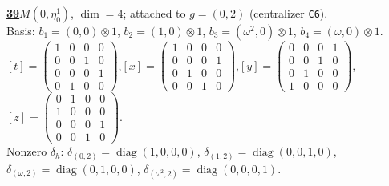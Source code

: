 \begin{samepage}\noindent\textbf{\underline{39}}\quad $M(0,\eta^{1}_{0})$, $\dim=4$; attached to $g=(0,2)$ (centralizer \texttt{C6}).\\
Basis: $b_{1}=(0,0)\otimes 1$, $b_{2}=(1,0)\otimes 1$, $b_{3}=(\omega^2,0)\otimes 1$, $b_{4}=(\omega,0)\otimes 1$.\\
$[t]=\left(\begin{smallmatrix} 1 & 0 & 0 & 0 \\ 0 & 0 & 1 & 0 \\ 0 & 0 & 0 & 1 \\ 0 & 1 & 0 & 0 \end{smallmatrix}\right)$,\quad $[x]=\left(\begin{smallmatrix} 1 & 0 & 0 & 0 \\ 0 & 0 & 0 & 1 \\ 0 & 1 & 0 & 0 \\ 0 & 0 & 1 & 0 \end{smallmatrix}\right)$,\quad $[y]=\left(\begin{smallmatrix} 0 & 0 & 0 & 1 \\ 0 & 0 & 1 & 0 \\ 0 & 1 & 0 & 0 \\ 1 & 0 & 0 & 0 \end{smallmatrix}\right)$,\quad $[z]=\left(\begin{smallmatrix} 0 & 1 & 0 & 0 \\ 1 & 0 & 0 & 0 \\ 0 & 0 & 0 & 1 \\ 0 & 0 & 1 & 0 \end{smallmatrix}\right)$.\\
Nonzero $\delta_h$: $\delta_{(0,2)}=\operatorname{diag}(1,0,0,0)$, $\delta_{(1,2)}=\operatorname{diag}(0,0,1,0)$, $\delta_{(\omega,2)}=\operatorname{diag}(0,1,0,0)$, $\delta_{(\omega^2,2)}=\operatorname{diag}(0,0,0,1)$.\end{samepage}
\medskip

